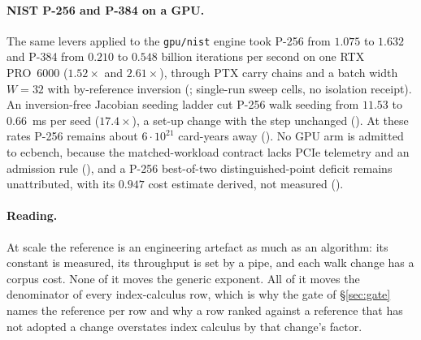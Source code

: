 \paragraph{NIST P-256 and P-384 on a GPU.} The same levers applied to the
\texttt{gpu/nist} engine took P-256 from $1.075$ to $1.632$ and P-384 from
$0.210$ to $0.548$ billion iterations per second on one RTX PRO~6000
($1.52\times$ and $2.61\times$), through PTX carry chains and a batch width
$W=32$ with by-reference inversion (;
single-run sweep cells, no isolation receipt). An inversion-free Jacobian
seeding ladder cut P-256 walk seeding from $11.53$ to $0.66$~ms per seed
($17.4\times$), a set-up change with the step unchanged
(). At these rates P-256 remains
about $6\cdot10^{21}$ card-years away (). No GPU arm is
admitted to ecbench, because the matched-workload contract lacks PCIe
telemetry and an admission rule
(), and a P-256
best-of-two distinguished-point deficit remains unattributed, with its
$0.947$ cost estimate derived, not measured
().

\paragraph{Reading.} At scale the reference is an engineering artefact as
much as an algorithm: its constant is measured, its throughput is set by a
pipe, and each walk change has a corpus cost. None of it moves the generic
exponent. All of it moves the denominator of every index-calculus row,
which is why the gate of \S\ref{sec:gate} names the reference per row and
why a row ranked against a reference that has not adopted a change
overstates index calculus by that change's factor.
